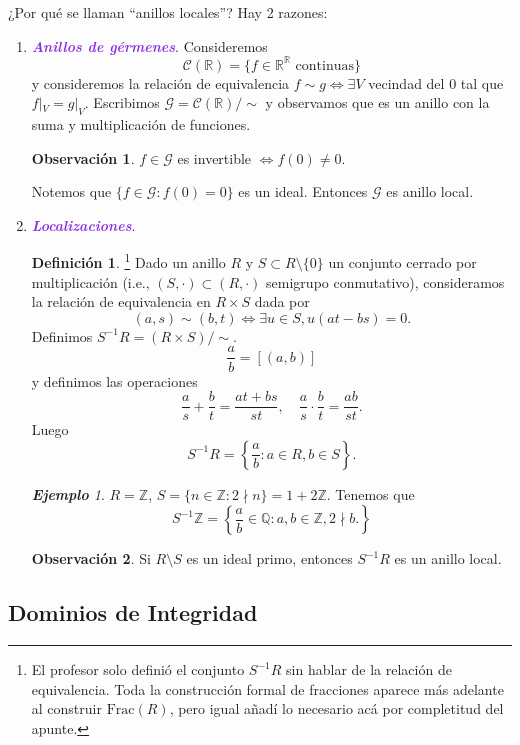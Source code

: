 \documentclass{article}
\theoremstyle{definition}
\newtheorem{definition}[theorem]{Definición}
\newtheorem*{obs}{Observación}
\theoremstyle{remark}
\newtheorem{example}[theorem]{\textbf{Ejemplo}}
\numberwithin{equation}{section}
\newcommand{\Q}{\mathbb{Q}}
\newcommand{\R}{\mathbb{R}}
\newcommand{\Z}{\mathbb{Z}}
\newcommand{\Ccal}{\mathcal{C}}
\newcommand{\Gcal}{\mathcal{G}}
\renewcommand{\c}{\cdot}
\newcommand{\Frac}{\mathrm{Frac}}
\newcommand{\set}[1]{\left\{ #1 \right\}}
\newcommand{\wea}[1]{\textcolor{BlueViolet}{\textbf{\emph{#1}}}}
\begin{document}
¿Por qué se llaman ``anillos locales''?
Hay 2 razones: 
\begin{enumerate}[(1)]
\item \wea{Anillos de gérmenes}. Consideremos 
\[ \Ccal(\R) = \{f \in \R^\R \text{ continuas}\} \]
y consideremos la relación de equivalencia $f \sim g \iff \exists V$ vecindad del 0 tal que $f|_V = g|_V$.
Escribimos $\Gcal = \Ccal(\R)/{\sim}$ y observamos que es un anillo con la suma y multiplicación de funciones.
\begin{obs}
  $f \in \Gcal$ es invertible $\iff f(0) \neq 0$.
\end{obs}
Notemos que $\{f \in \Gcal \colon f(0) = 0\}$ es un ideal. Entonces $\Gcal$ es anillo local.

\item \wea{Localizaciones}.
\begin{definition}\footnote{El profesor solo definió el conjunto $S^{-1}R$ sin hablar de la relación de equivalencia. Toda la construcción formal de fracciones aparece más adelante al construir $\Frac(R)$, pero igual añadí lo necesario acá por completitud del apunte.}
  Dado un anillo $R$ y $S \subset R \setminus \{0\}$ un conjunto cerrado por multiplicación (i.e., $(S,\c) \subset (R,\c)$ semigrupo conmutativo), consideramos la relación de equivalencia en $R \times S$ dada por
  \[ (a,s) \sim (b,t) \iff \exists u \in S, u(at - bs) = 0. \]
  Definimos $S^{-1}R = (R \times S)/{\sim}$.
  \[ \frac{a}{b} = [(a,b)] \]
  y definimos las operaciones 
  \[ \frac{a}{s} + \frac{b}{t} = \frac{at + bs}{st}, \quad \frac{a}{s} \c \frac{b}{t} = \frac{ab}{st}. \]
  Luego
  \[ S^{-1}R = \set{\frac{a}{b} \colon a \in R, b \in S}. \]
\end{definition}

\begin{example}
  $R = \Z$, $S = \{n \in \Z \colon 2 \nmid n\} = 1 + 2\Z$. Tenemos que 
  \[ S^{-1}\Z = \set{\frac{a}{b} \in \Q \colon a,b \in \Z , 2 \nmid b.} \]
\end{example}

\begin{obs}
  Si $R \setminus S$ es un ideal primo, entonces $S^{-1} R$ es un anillo local.
\end{obs}
\end{enumerate}


\subsection{Dominios de Integridad}
\end{document}
